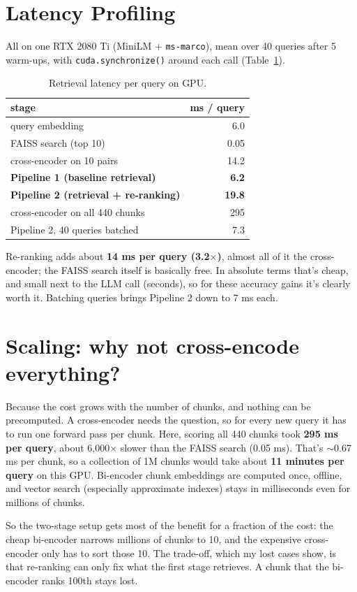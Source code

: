 \documentclass[10pt,a4paper]{article}
\begin{document}
\section{Latency Profiling}

All on one RTX 2080 Ti (MiniLM + \texttt{ms-marco}), mean over 40 queries after 5 warm-ups, with \texttt{cuda.synchronize()} around each call (Table~\ref{tab:lat}).

\begin{table}[htbp]
\centering\small
\begin{tabular}{@{}lr@{}}
\toprule
\textbf{stage} & \textbf{ms / query} \\
\midrule
query embedding & 6.0 \\
FAISS search (top 10) & 0.05 \\
cross-encoder on 10 pairs & 14.2 \\
\midrule
\rowcolor{rowtint}\textbf{Pipeline 1 (baseline retrieval)} & \textbf{6.2} \\
\rowcolor{rowtint}\textbf{Pipeline 2 (retrieval + re-ranking)} & \textbf{19.8} \\
\midrule
cross-encoder on all 440 chunks & 295 \\
Pipeline 2, 40 queries batched & 7.3 \\
\bottomrule
\end{tabular}
\caption{Retrieval latency per query on GPU.}
\label{tab:lat}
\end{table}

Re-ranking adds about \textbf{14 ms per query (3.2$\times$)}, almost all of it the cross-encoder; the FAISS search itself is basically free. In absolute terms that's cheap, and small next to the LLM call (seconds), so for these accuracy gains it's clearly worth it. Batching queries brings Pipeline 2 down to 7 ms each.

\section{Scaling: why not cross-encode everything?}

Because the cost grows with the number of chunks, and nothing can be precomputed. A cross-encoder needs the question, so for every new query it has to run one forward pass per chunk. Here, scoring all 440 chunks took \textbf{295 ms per query}, about 6{,}000$\times$ slower than the FAISS search (0.05 ms). That's $\sim$0.67 ms per chunk, so a collection of 1M chunks would take about \textbf{11 minutes per query} on this GPU. Bi-encoder chunk embeddings are computed once, offline, and vector search (especially approximate indexes) stays in milliseconds even for millions of chunks.

So the two-stage setup gets most of the benefit for a fraction of the cost: the cheap bi-encoder narrows millions of chunks to 10, and the expensive cross-encoder only has to sort those 10. The trade-off, which my lost cases show, is that re-ranking can only fix what the first stage retrieves. A chunk that the bi-encoder ranks 100th stays lost.
\end{document}
